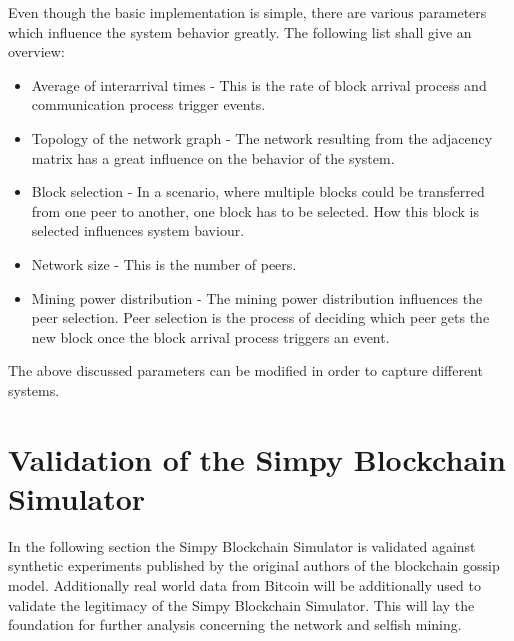 Even though the basic implementation is simple, there are various parameters which influence the system behavior greatly. The following list shall give an overview:
\begin{itemize}
\item Average of interarrival times - This is the rate of block arrival process and communication process trigger events. 
\item Topology of the network graph - The network resulting from the adjacency matrix has a great influence on the behavior of the system.
\item Block selection - In a scenario, where multiple blocks could be transferred from one peer to another, one block has to be selected. How this block is selected influences system baviour.
\item Network size - This is the number of peers.
\item Mining power distribution - The mining power distribution influences the peer selection. Peer selection is the process of deciding which peer gets the new block once the block arrival process triggers an event.
\end{itemize}
The above discussed parameters can be modified in order to capture different systems.

\section{Validation of the Simpy Blockchain Simulator}
In the following section the Simpy Blockchain Simulator is validated against synthetic experiments published by the original authors of the blockchain gossip model. Additionally real world data from Bitcoin will be additionally used to validate the legitimacy of the Simpy Blockchain Simulator. This will lay the foundation for further analysis concerning the network and selfish mining. 
